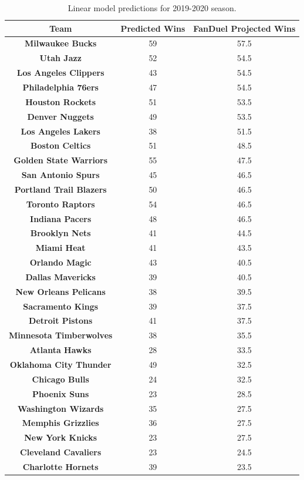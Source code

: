 \documentclass[pageno]{jpaper}
\begin{document}
\begin{table}[hbt]
  \centering
  \begin{tabular}{|ccc|}
    \hline
    \textbf{Team} & \textbf{Predicted Wins} & \textbf{FanDuel Projected Wins}\\
    \hline
    \textbf{Milwaukee Bucks} & 59 & 57.5\\
    \textbf{Utah Jazz} & 52 & 54.5\\
    \textbf{Los Angeles Clippers} & 43 & 54.5\\
    \textbf{Philadelphia 76ers} & 47 & 54.5\\
    \textbf{Houston Rockets} & 51 & 53.5\\
    \textbf{Denver Nuggets} & 49 & 53.5\\
    \textbf{Los Angeles Lakers} & 38 & 51.5\\
    \textbf{Boston Celtics} & 51 & 48.5\\
    \textbf{Golden State Warriors} & 55 & 47.5\\
    \textbf{San Antonio Spurs} & 45 & 46.5\\
    \textbf{Portland Trail Blazers} & 50 & 46.5\\
    \textbf{Toronto Raptors} & 54 & 46.5\\
    \textbf{Indiana Pacers} & 48 & 46.5\\
    \textbf{Brooklyn Nets} & 41 & 44.5\\
    \textbf{Miami Heat} & 41 & 43.5\\
    \textbf{Orlando Magic} & 43 & 40.5\\
    \textbf{Dallas Mavericks} & 39 & 40.5\\
    \textbf{New Orleans Pelicans} & 38 & 39.5\\
    \textbf{Sacramento Kings} & 39 & 37.5\\
    \textbf{Detroit Pistons} & 41 & 37.5\\
    \textbf{Minnesota Timberwolves} & 38 & 35.5\\
    \textbf{Atlanta Hawks} & 28 & 33.5\\
    \textbf{Oklahoma City Thunder} & 49 & 32.5\\
    \textbf{Chicago Bulls} & 24 & 32.5\\
    \textbf{Phoenix Suns} & 23 & 28.5\\
    \textbf{Washington Wizards} & 35 & 27.5\\
    \textbf{Memphis Grizzlies} & 36 & 27.5\\
    \textbf{New York Knicks} & 23 & 27.5\\
    \textbf{Cleveland Cavaliers} & 23 & 24.5\\
    \textbf{Charlotte Hornets} & 39 & 23.5\\
    \hline
  \end{tabular}
  \caption{Linear model predictions for 2019-2020 season.}
  \label{table:currentpreds}
\end{table}
\end{document}
